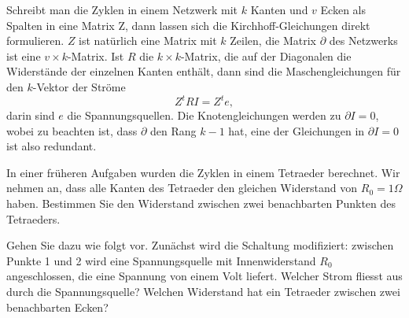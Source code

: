 Schreibt man die Zyklen in einem Netzwerk mit $k$ Kanten und $v$ Ecken
als Spalten in eine Matrix Z,
dann lassen sich die Kirchhoff-Gleichungen direkt formulieren.
$Z$ ist natürlich eine Matrix mit $k$ Zeilen, die Matrix $\partial$
des Netzwerks ist eine $v\times k$-Matrix.
Ist $R$ die $k\times k$-Matrix, die auf der Diagonalen die Widerstände der
einzelnen Kanten enthält, dann sind die Maschengleichungen für den
$k$-Vektor der Ströme 
\[
Z^tRI=Z^te,
\]
darin sind $e$ die Spannungsquellen.
Die Knotengleichungen werden zu $\partial I=0$, wobei zu beachten ist,
dass $\partial$ den Rang $k-1$ hat, eine der Gleichungen in $\partial I=0$ 
ist also redundant.

In einer früheren Aufgaben wurden die Zyklen in einem Tetraeder berechnet.
Wir nehmen an, dass alle Kanten des Tetraeder den gleichen Widerstand von
$R_0=1\Omega$ haben. Bestimmen Sie den Widerstand zwischen zwei benachbarten
Punkten des Tetraeders.

\begin{hinweis}
Gehen Sie dazu wie folgt vor.
Zunächst wird die Schaltung modifiziert: zwischen Punkte 1 und 2 wird eine
Spannungsquelle mit Innenwiderstand $R_0$ angeschlossen,
die eine Spannung von einem Volt liefert.
Welcher Strom fliesst aus durch die Spannungsquelle? Welchen Widerstand
hat ein Tetraeder zwischen zwei benachbarten Ecken?
\end{hinweis}

